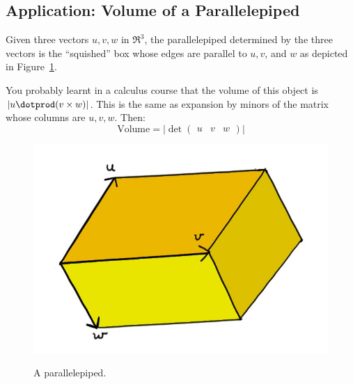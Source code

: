 \subsection{Application: Volume of a Parallelepiped}

Given three vectors $u,v,w$ in $\Re^3$, the parallelepiped determined by the three vectors is the ``squished'' box whose edges are parallel to $u, v$, and $w$ as depicted in Figure~\ref{parallelepiped}.

You probably learnt in a  calculus course  that the volume of this object is $|u\dotprod (v\times w)|$.  This is the same as expansion by minors of the matrix whose columns are $u,v,w$.  Then:
\[
\text{Volume}=\big|\det \begin{pmatrix}u & v & w \end{pmatrix} \big|
\] 



\begin{figure}
\begin{center}
\includegraphics[alt={A parallelepiped with edge vectors u, v, and w.},scale=.4]{parallelepiped.jpg}
\caption{A parallelepiped.\label{parallelepiped}}
\end{center}
\end{figure}







